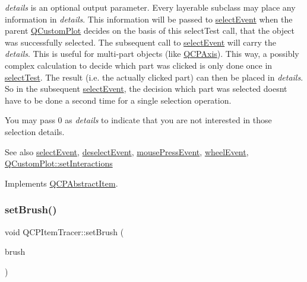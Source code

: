 {\itshape details} is an optional output parameter. Every layerable subclass may place any information in {\itshape details}. This information will be passed to \mbox{\hyperlink{class_q_c_p_abstract_item_aa4b969c58797f39c9c0b6c07c7869d17}{select\+Event}} when the parent \mbox{\hyperlink{class_q_custom_plot}{Q\+Custom\+Plot}} decides on the basis of this select\+Test call, that the object was successfully selected. The subsequent call to \mbox{\hyperlink{class_q_c_p_abstract_item_aa4b969c58797f39c9c0b6c07c7869d17}{select\+Event}} will carry the {\itshape details}. This is useful for multi-\/part objects (like \mbox{\hyperlink{class_q_c_p_axis}{Q\+C\+P\+Axis}}). This way, a possibly complex calculation to decide which part was clicked is only done once in \mbox{\hyperlink{class_q_c_p_item_tracer_a9fd955fea40e977d66f3a9fd5765aec4}{select\+Test}}. The result (i.\+e. the actually clicked part) can then be placed in {\itshape details}. So in the subsequent \mbox{\hyperlink{class_q_c_p_abstract_item_aa4b969c58797f39c9c0b6c07c7869d17}{select\+Event}}, the decision which part was selected doesn\textquotesingle{}t have to be done a second time for a single selection operation.

You may pass 0 as {\itshape details} to indicate that you are not interested in those selection details.

\begin{DoxySeeAlso}{See also}
\mbox{\hyperlink{class_q_c_p_abstract_item_aa4b969c58797f39c9c0b6c07c7869d17}{select\+Event}}, \mbox{\hyperlink{class_q_c_p_abstract_item_af9093798cb07a861dcc73f93ca16c0c1}{deselect\+Event}}, \mbox{\hyperlink{class_q_c_p_layerable_af6567604818db90f4fd52822f8bc8376}{mouse\+Press\+Event}}, \mbox{\hyperlink{class_q_c_p_layerable_a47dfd7b8fd99c08ca54e09c362b6f022}{wheel\+Event}}, \mbox{\hyperlink{class_q_custom_plot_a5ee1e2f6ae27419deca53e75907c27e5}{Q\+Custom\+Plot\+::set\+Interactions}} 
\end{DoxySeeAlso}


Implements \mbox{\hyperlink{class_q_c_p_abstract_item_ae41d0349d68bb802c49104afd100ba2a}{Q\+C\+P\+Abstract\+Item}}.

\mbox{\label{class_q_c_p_item_tracer_a2c303f7470a30084daa201ed556b3c36}} 
\subsubsection{\texorpdfstring{setBrush()}{setBrush()}}
{\footnotesize\ttfamily void Q\+C\+P\+Item\+Tracer\+::set\+Brush (\begin{DoxyParamCaption}\item[{const Q\+Brush \&}]{brush }\end{DoxyParamCaption})}

